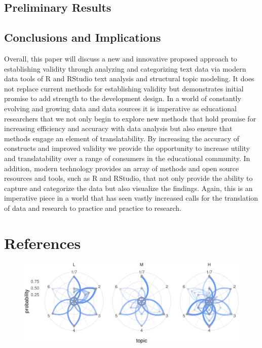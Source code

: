\documentclass[doc]{apa6}
\theoremstyle{definition}
\theoremstyle{definition}
\theoremstyle{definition}
\theoremstyle{remark}
\begin{document}
\subsection{Preliminary Results}\label{preliminary-results}

\subsection{Conclusions and
Implications}\label{conclusions-and-implications}

Overall, this paper will discuss a new and innovative proposed approach
to establishing validity through analyzing and categorizing text data
via modern data tools of R and RStudio text analysis and structural
topic modeling. It does not replace current methods for establishing
validity but demonstrates initial promise to add strength to the
development design. In a world of constantly evolving and growing data
and data sources it is imperative as educational researchers that we not
only begin to explore new methods that hold promise for increasing
efficiency and accuracy with data analysis but also ensure that methods
engage an element of translatability. By increasing the accuracy of
constructs and improved validity we provide the opportunity to increase
utility and translatability over a range of consumers in the educational
community. In addition, modern technology provides an array of methods
and open source resources and tools, such as R and RStudio, that not
only provide the ability to capture and categorize the data but also
visualize the findings. Again, this is an imperative piece in a world
that has seen vastly increased calls for the translation of data and
research to practice and practice to research.

\newpage

\section{References}\label{references}

\begin{figure}
\centering
\includegraphics{ncme19_files/figure-latex/modeling-1.pdf}
\caption{}
\end{figure}
\end{document}
